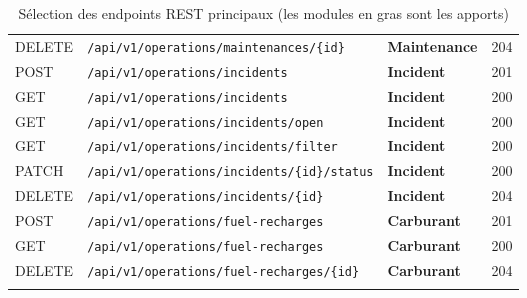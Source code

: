 \documentclass[12pt,a4paper]{report}
\begin{document}
\begin{longtable}{p{1.5cm}p{7cm}p{2.5cm}p{1.5cm}}
DELETE & \texttt{/api/v1/operations/maintenances/\{id\}} & \textbf{Maintenance} & 204 \\
POST & \texttt{/api/v1/operations/incidents} & \textbf{Incident} & 201 \\
GET & \texttt{/api/v1/operations/incidents} & \textbf{Incident} & 200 \\
GET & \texttt{/api/v1/operations/incidents/open} & \textbf{Incident} & 200 \\
GET & \texttt{/api/v1/operations/incidents/filter} & \textbf{Incident} & 200 \\
PATCH & \texttt{/api/v1/operations/incidents/\{id\}/status} & \textbf{Incident} & 200 \\
DELETE & \texttt{/api/v1/operations/incidents/\{id\}} & \textbf{Incident} & 204 \\
POST & \texttt{/api/v1/operations/fuel-recharges} & \textbf{Carburant} & 201 \\
GET & \texttt{/api/v1/operations/fuel-recharges} & \textbf{Carburant} & 200 \\
DELETE & \texttt{/api/v1/operations/fuel-recharges/\{id\}} & \textbf{Carburant} & 204 \\
\bottomrule
\caption{Sélection des endpoints REST principaux (les modules en gras sont les apports)}
\end{longtable}
\end{document}

